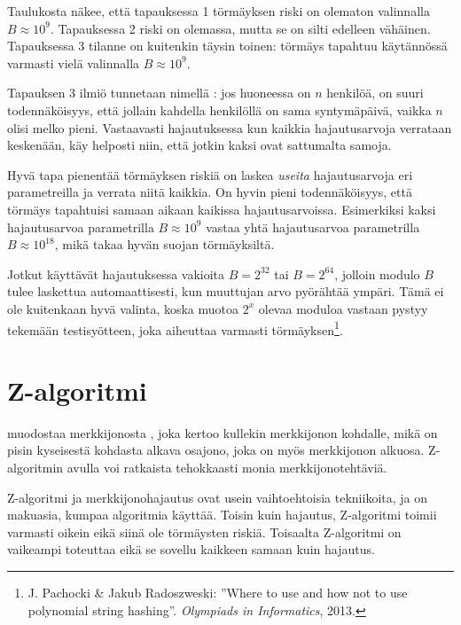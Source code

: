 Taulukosta näkee, että tapauksessa 1
törmäyksen riski on olematon
valinnalla $B \approx 10^9$.
Tapauksessa 2 riski on olemassa, mutta se on silti edelleen vähäinen.
Tapauksessa 3 tilanne on kuitenkin täysin toinen:
törmäys tapahtuu käytännössä varmasti
vielä valinnalla $B \approx 10^9$.


Tapauksen 3 ilmiö tunnetaan nimellä
:
jos huoneessa on $n$ henkilöä, on suuri
todennäköisyys, että jollain kahdella
henkilöllä on sama syntymäpäivä, vaikka
$n$ olisi melko pieni.
Vastaavasti hajautuksessa kun kaikkia
hajautusarvoja verrataan keskenään,
käy helposti niin, että jotkin
kaksi ovat sattumalta samoja.

Hyvä tapa pienentää törmäyksen riskiä on laskea
\emph{useita} hajautusarvoja eri parametreilla
ja verrata niitä kaikkia.
On hyvin pieni todennäköisyys,
että törmäys tapahtuisi samaan aikaan
kaikissa hajautusarvoissa.
Esimerkiksi kaksi hajautusarvoa parametrilla
$B \approx 10^9$ vastaa yhtä hajautusarvoa
parametrilla $B \approx 10^{18}$,
mikä takaa hyvän suojan törmäyksiltä.

Jotkut käyttävät hajautuksessa vakioita $B=2^{32}$ tai $B=2^{64}$,
jolloin modulo $B$ tulee laskettua
automaattisesti, kun muuttujan arvo pyörähtää ympäri.
Tämä ei ole kuitenkaan hyvä valinta,
koska muotoa $2^x$ olevaa moduloa vastaan
pystyy tekemään testisyötteen, joka aiheuttaa varmasti törmäyksen\footnote{
J. Pachocki \& Jakub Radoszweski:
''Where to use and how not to use polynomial string hashing''.
\textit{Olympiads in Informatics}, 2013.
}.

\section{Z-algoritmi}


 muodostaa merkkijonosta ,
joka kertoo kullekin merkkijonon kohdalle,
mikä on pisin kyseisestä kohdasta alkava osajono,
joka on myös merkkijonon alkuosa.
Z-algoritmin avulla voi ratkaista tehokkaasti
monia merkkijonotehtäviä.

Z-algoritmi ja merkkijonohajautus ovat usein
vaihtoehtoisia tekniikoita, ja on makuasia,
kumpaa algoritmia käyttää.
Toisin kuin hajautus, Z-algoritmi toimii
varmasti oikein eikä siinä ole törmäysten riskiä.
Toisaalta Z-algoritmi on vaikeampi toteuttaa eikä
se sovellu kaikkeen samaan kuin hajautus.

